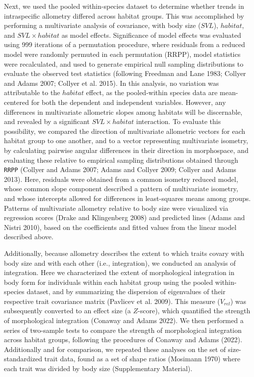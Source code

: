 \documentclass[
  11pt,
]{article}
\begin{document}
Next, we used the pooled within-species dataset to determine whether
trends in intraspecific allometry differed across habitat groups. This
was accomplished by performing a multivariate analysis of covariance,
with body size (\(SVL\)), \(habitat\), and \(SVL \times habitat\) as
model effects. Significance of model effects was evaluated using 999
iterations of a permutation procedure, where residuals from a reduced
model were randomly permuted in each permutation (RRPP), model
statistics were recalculated, and used to generate empirical null
sampling distributions to evaluate the observed test statistics
(following Freedman and Lane 1983; Collyer and Adams 2007; Collyer et
al. 2015). In this analysis, no variation was attributable to the
\(habitat\) effect, as the pooled-within species data are mean-centered
for both the dependent and independent variables. However, any
differences in multivariate allometric slopes among habitats will be
discernable, and revealed by a significant \(SVL \times habitat\)
interaction. To evaluate this possibility, we compared the direction of
multivariate allometric vectors for each habitat group to one another,
and to a vector representing multivariate isometry, by calculating
pairwise angular differences in their direction in morphospace, and
evaluating these relative to empirical sampling distributions obtained
through \texttt{RRPP} (Collyer and Adams 2007; Adams and Collyer 2009;
Collyer and Adams 2013). Here, residuals were obtained from a common
isometry reduced model, whose common slope component described a pattern
of multivariate isometry, and whose intercepts allowed for differences
in least-squares means among groups. Patterns of multivariate allometry
relative to body size were visualized via regression scores (Drake and
Klingenberg 2008) and predicted lines (Adams and Nistri 2010), based on
the coefficients and fitted values from the linear model described
above. \hfill\break

Additionally, because allometry describes the extent to which traits
covary with body size and with each other (i.e., integration), we
conducted an analysis of integration. Here we characterized the extent
of morphological integration in body form for individuals within each
habitat group using the pooled within-species dataset, and by
summarizing the dispersion of eigenvalues of their respective trait
covariance matrix (Pavlicev et al. 2009). This measure (\(V_{rel}\)) was
subsequently converted to an effect size (a \(Z\)-score), which
quantified the strength of morphological integration (Conaway and Adams
2022). We then performed a series of two-sample tests to compare the
strength of morphological integration across habitat groups, following
the procedures of Conaway and Adams (2022). Additionally and for
comparison, we repeated these analyses on the set of size-standardized
trait data, found as a set of shape ratios (Mosimann 1970) where each
trait was divided by body size (Supplementary Material). \hfill\break
\end{document}
